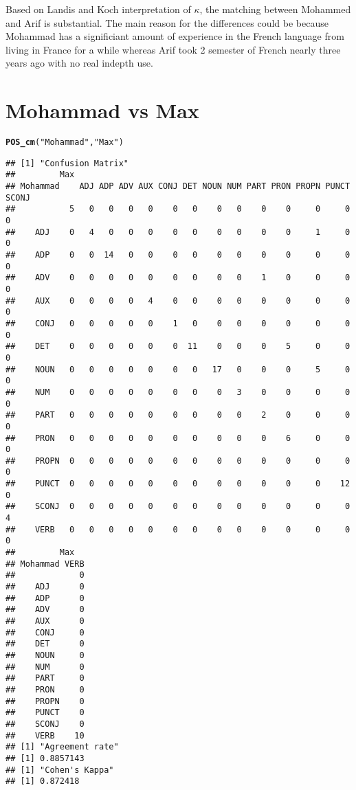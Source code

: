 \documentclass{article}\usepackage[]{graphicx}\usepackage[]{color}
\makeatletter
\newcommand{\hlstr}[1]{\textcolor[rgb]{0.192,0.494,0.8}{#1}}%
\newcommand{\hlstd}[1]{\textcolor[rgb]{0.345,0.345,0.345}{#1}}%
\newcommand{\hlkwd}[1]{\textcolor[rgb]{0.737,0.353,0.396}{\textbf{#1}}}%
\newenvironment{kframe}{%
 \def\at@end@of@kframe{}%
 \ifinner\ifhmode%
  \def\at@end@of@kframe{\end{minipage}}%
  \begin{minipage}{\columnwidth}%
 \fi\fi%
 \def\FrameCommand##1{\hskip\@totalleftmargin \hskip-\fboxsep
 \colorbox{shadecolor}{##1}\hskip-\fboxsep
     \hskip-\linewidth \hskip-\@totalleftmargin \hskip\columnwidth}%
 \MakeFramed {\advance\hsize-\width
   \@totalleftmargin\z@ \linewidth\hsize
   \@setminipage}}%
 {\par\unskip\endMakeFramed%
 \at@end@of@kframe}
\newenvironment{knitrout}{}{} %
\makeatother
\begin{document}
Based on Landis and Koch interpretation of $\kappa$, the matching between Mohammed and Arif is substantial. The main reason for the differences could be because Mohammad has a significiant amount of experience in the French language from living in France for a while whereas Arif took 2 semester of French nearly three years ago with no real indepth use.
\section*{Mohammad vs Max}
\begin{knitrout}
\color{fgcolor}\begin{kframe}
\begin{alltt}
\hlkwd{POS_cm}\hlstd{(}\hlstr{"Mohammad"}\hlstd{,}\hlstr{"Max"}\hlstd{)}
\end{alltt}
\begin{verbatim}
## [1] "Confusion Matrix"
##         Max
## Mohammad    ADJ ADP ADV AUX CONJ DET NOUN NUM PART PRON PROPN PUNCT SCONJ
##           5   0   0   0   0    0   0    0   0    0    0     0     0     0
##    ADJ    0   4   0   0   0    0   0    0   0    0    0     1     0     0
##    ADP    0   0  14   0   0    0   0    0   0    0    0     0     0     0
##    ADV    0   0   0   0   0    0   0    0   0    1    0     0     0     0
##    AUX    0   0   0   0   4    0   0    0   0    0    0     0     0     0
##    CONJ   0   0   0   0   0    1   0    0   0    0    0     0     0     0
##    DET    0   0   0   0   0    0  11    0   0    0    5     0     0     0
##    NOUN   0   0   0   0   0    0   0   17   0    0    0     5     0     0
##    NUM    0   0   0   0   0    0   0    0   3    0    0     0     0     0
##    PART   0   0   0   0   0    0   0    0   0    2    0     0     0     0
##    PRON   0   0   0   0   0    0   0    0   0    0    6     0     0     0
##    PROPN  0   0   0   0   0    0   0    0   0    0    0     0     0     0
##    PUNCT  0   0   0   0   0    0   0    0   0    0    0     0    12     0
##    SCONJ  0   0   0   0   0    0   0    0   0    0    0     0     0     4
##    VERB   0   0   0   0   0    0   0    0   0    0    0     0     0     0
##         Max
## Mohammad VERB
##             0
##    ADJ      0
##    ADP      0
##    ADV      0
##    AUX      0
##    CONJ     0
##    DET      0
##    NOUN     0
##    NUM      0
##    PART     0
##    PRON     0
##    PROPN    0
##    PUNCT    0
##    SCONJ    0
##    VERB    10
## [1] "Agreement rate"
## [1] 0.8857143
## [1] "Cohen's Kappa"
## [1] 0.872418
\end{verbatim}
\end{kframe}
\end{knitrout}
\end{document}
